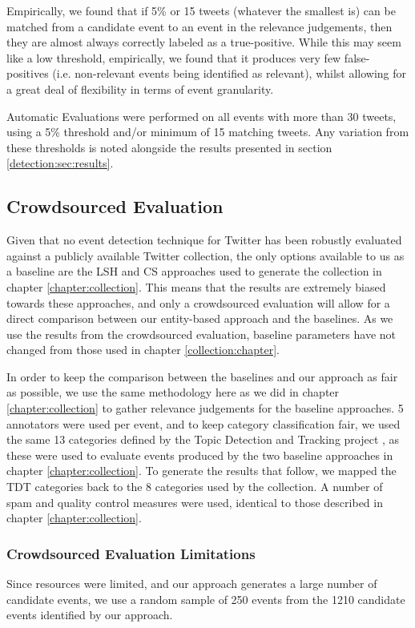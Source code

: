Empirically, we found that if 5\% or 15 tweets (whatever the smallest is) can be matched from a candidate event to an event in the relevance judgements, then they are almost always correctly labeled as a true-positive.
While this may seem like a low threshold, empirically, we found that it produces very few false-positives (i.e. non-relevant events being identified as relevant), whilst allowing for a great deal of flexibility in terms of event granularity.

Automatic Evaluations were performed on all events with more than 30 tweets, using a 5\% threshold and/or minimum of 15 matching tweets.
Any variation from these thresholds is noted alongside the results presented in section \ref{detection:sec:results}.

\subsection{Crowdsourced Evaluation}
\label{sec:baseline}
Given that no event detection technique for Twitter has been robustly evaluated against a publicly available Twitter collection, the only options available to us as a baseline are the LSH \citep{Petrovic10} and CS \citep{Aggarwal12} approaches used to generate the collection in chapter \ref{chapter:collection}.
This means that the results are extremely biased towards these approaches, and only a crowdsourced evaluation will allow for a direct comparison between our entity-based approach and the baselines.
As we use the results from the crowdsourced evaluation, baseline parameters have not changed from those used in chapter \ref{collection:chapter}.

\label{detection:sec:crowd}
In order to keep the comparison between the baselines and our approach as fair as possible, we use the same methodology here as we did in chapter \ref{chapter:collection} to gather relevance judgements for the baseline approaches.
5 annotators were used per event, and to keep category classification fair, we used the same 13 categories defined by the Topic Detection and Tracking project \citep{Allan:2002:ITD:772260.772262}, as these were used to evaluate events produced by the two baseline approaches in chapter \ref{chapter:collection}.
To generate the results that follow, we mapped the TDT categories back to the 8 categories used by the collection.
A number of spam and quality control measures were used, identical to those described in chapter \ref{chapter:collection}.

\subsubsection{Crowdsourced Evaluation Limitations}
Since resources were limited, and our approach generates a large number of candidate events, we use a random sample of 250 events from the 1210 candidate events identified by our approach.

